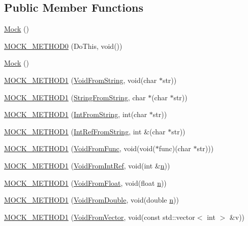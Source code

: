 \subsection*{Public Member Functions}
\begin{DoxyCompactItemize}
\item 
\hyperlink{classMock_a2b9528f2e7fcf9738201a5ea667c1998}{Mock} ()
\item 
\hyperlink{classMock_ae710f23cafb1a2f17772e8805d6312d2}{M\+O\+C\+K\+\_\+\+M\+E\+T\+H\+O\+D0} (Do\+This, void())
\item 
\hyperlink{classMock_a2b9528f2e7fcf9738201a5ea667c1998}{Mock} ()
\item 
\hyperlink{classMock_ada59eea6991953353f332e3ea1e74444}{M\+O\+C\+K\+\_\+\+M\+E\+T\+H\+O\+D1} (\hyperlink{classInterface_a65d6ae604e7e9a513aec72c9c94e0b97}{Void\+From\+String}, void(char $\ast$str))
\item 
\hyperlink{classMock_a2db4d82b6f92b4e462929f651ac4c3b1}{M\+O\+C\+K\+\_\+\+M\+E\+T\+H\+O\+D1} (\hyperlink{classInterface_a756b1d22c12aa3f14a5083f90043fbf0}{String\+From\+String}, char $\ast$(char $\ast$str))
\item 
\hyperlink{classMock_ae73b4ee90bf6d84205d2b1c17f0b8433}{M\+O\+C\+K\+\_\+\+M\+E\+T\+H\+O\+D1} (\hyperlink{classInterface_ab34c8a5fd2236a6b009f86a4e5851b61}{Int\+From\+String}, int(char $\ast$str))
\item 
\hyperlink{classMock_a2cece30a3ea92b34f612f8032fe3a0f9}{M\+O\+C\+K\+\_\+\+M\+E\+T\+H\+O\+D1} (\hyperlink{classInterface_ab93276de67e60c44fd775d4c139aa8e1}{Int\+Ref\+From\+String}, int \&(char $\ast$str))
\item 
\hyperlink{classMock_ac70c052254fa9816bd759c006062dc47}{M\+O\+C\+K\+\_\+\+M\+E\+T\+H\+O\+D1} (\hyperlink{classInterface_a7dab3c82b857a9a5f52b3ce6f7df547f}{Void\+From\+Func}, void(void($\ast$func)(char $\ast$str)))
\item 
\hyperlink{classMock_ae2379efbc030f1adf8b032be3bdf081d}{M\+O\+C\+K\+\_\+\+M\+E\+T\+H\+O\+D1} (\hyperlink{classInterface_aa43fb56650a57b6b3e7743e54e50cb86}{Void\+From\+Int\+Ref}, void(int \&\hyperlink{app_2main_8cpp_acfc02ec89670db29251fda6a66602ce2}{n}))
\item 
\hyperlink{classMock_a3fd62026610c5d3d3aeaaf2ade3e18aa}{M\+O\+C\+K\+\_\+\+M\+E\+T\+H\+O\+D1} (\hyperlink{classInterface_ae2b3e9411c893a45642d3af632752c66}{Void\+From\+Float}, void(float \hyperlink{app_2main_8cpp_acfc02ec89670db29251fda6a66602ce2}{n}))
\item 
\hyperlink{classMock_a890668928abcd28d4d39df164e7b6dd8}{M\+O\+C\+K\+\_\+\+M\+E\+T\+H\+O\+D1} (\hyperlink{classInterface_aa56524017aabdbe46510648c711ab8a8}{Void\+From\+Double}, void(double \hyperlink{app_2main_8cpp_acfc02ec89670db29251fda6a66602ce2}{n}))
\item 
\hyperlink{classMock_a50e2bda4375a59bb89fd5652bd33eb0f}{M\+O\+C\+K\+\_\+\+M\+E\+T\+H\+O\+D1} (\hyperlink{classInterface_ae84fe7e53f881db2f823ad35d004927a}{Void\+From\+Vector}, void(const std\+::vector$<$ int $>$ \&v))
\end{DoxyCompactItemize}


